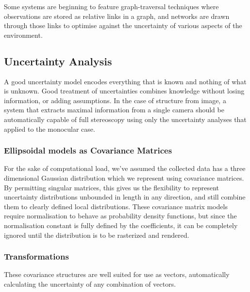\documentclass[a4paper, 11pt, titlepage]{article}
\begin{document}
      Some systems are beginning to feature graph-traversal techniques where observations are stored as relative links in a graph, and networks are drawn through those links to optimise against the uncertainty of various aspects of the environment.

  \subsection{Uncertainty Analysis}
    A good uncertainty model encodes everything that is known and nothing of what is unknown.
    Good treatment of uncertainties combines knowledge without losing information, or adding assumptions.
    In the case of structure from image, a system that extracts maximal information from a single camera should be automatically capable of full stereoscopy using only the uncertainty analyses that applied to the monocular case.
    \subsubsection{Ellipsoidal models as Covariance Matrices}
      For the sake of computational load, we've assumed the collected data has a three dimensional Gaussian distribution which we represent using covariance matrices.
      By permitting singular matrices, this gives us the flexibility to represent uncertainty distributions unbounded in length in any direction, and still combine them to clearly defined local distributions.
      These covariance matrix models require normalisation to behave as probability density functions, but since the normalisation constant is fully defined by the coefficients, it can be completely ignored until the distribution is to be rasterized and rendered.
    \subsubsection{Transformations}
      These covariance structures are well suited for use as vectors, automatically calculating the uncertainty of any combination of vectors.
      
\end{document}
